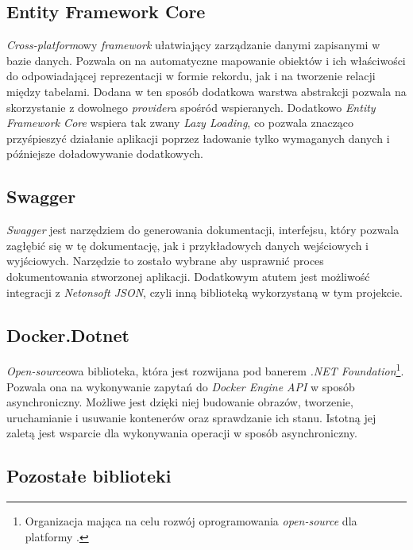 \subsection{Entity Framework Core}

\par \emph{Cross-platform}owy \emph{framework} ułatwiający zarządzanie danymi zapisanymi w bazie danych. Pozwala on na automatyczne mapowanie obiektów i ich właściwości do odpowiadającej reprezentacji w formie rekordu, jak i na tworzenie relacji między tabelami. Dodana w ten sposób dodatkowa warstwa abstrakcji pozwala na skorzystanie z dowolnego \emph{provider}a spośród wspieranych. Dodatkowo \emph{Entity Framework Core} wspiera tak zwany \emph{Lazy Loading}, co pozwala znacząco przyśpieszyć działanie aplikacji poprzez ładowanie tylko wymaganych danych i późniejsze doładowywanie dodatkowych.\cite{ENTITY_FRAMEWORK_DOCUMENTATION}

\subsection{Swagger}
\label{subsec:swagger}

\par \emph{Swagger} jest narzędziem do generowania dokumentacji, interfejsu, który pozwala zagłębić się w tę dokumentację, jak i przykładowych danych wejściowych i wyjściowych. Narzędzie to zostało wybrane aby usprawnić proces dokumentowania stworzonej aplikacji. Dodatkowym atutem jest możliwość integracji z \emph{Netonsoft JSON}, czyli inną biblioteką wykorzystaną w tym projekcie.\cite{SWAGGER_DOCUMENTATION}

\subsection{Docker.Dotnet}

\par \emph{Open-source}owa biblioteka, która jest rozwijana pod banerem \emph{.NET Foundation}\footnote{Organizacja mająca na celu rozwój oprogramowania \emph{open-source} dla platformy \emph{\dotnet{}}.}. Pozwala ona na wykonywanie zapytań do \emph{Docker Engine API} w sposób asynchroniczny. Możliwe jest dzięki niej budowanie obrazów, tworzenie, uruchamianie i usuwanie kontenerów oraz sprawdzanie ich stanu. Istotną jej zaletą jest wsparcie dla wykonywania operacji w sposób asynchroniczny.\cite{DockerDotNet_GitHub}

\subsection{Pozostałe biblioteki}


